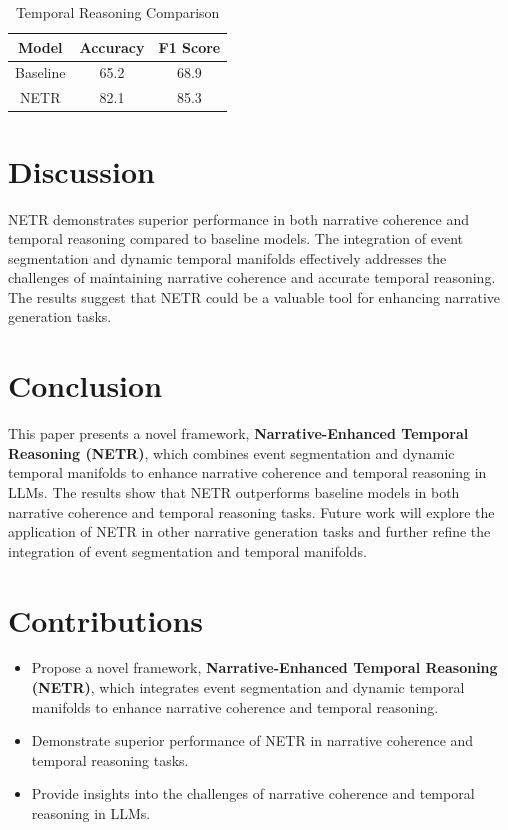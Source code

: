 \documentclass{article}
\begin{document}
\begin{table}[h!]
\centering
\caption{Temporal Reasoning Comparison}
\label{tab:temporal_reasoning}
\begin{tabular}{|c|c|c|}
\hline
Model & Accuracy & F1 Score \\
\hline
Baseline & 65.2 & 68.9 \\
NETR & 82.1 & 85.3 \\
\hline
\end{tabular}
\end{table}

\section{Discussion}
NETR demonstrates superior performance in both narrative coherence and temporal reasoning compared to baseline models. The integration of event segmentation and dynamic temporal manifolds effectively addresses the challenges of maintaining narrative coherence and accurate temporal reasoning. The results suggest that NETR could be a valuable tool for enhancing narrative generation tasks.

\section{Conclusion}
This paper presents a novel framework, \textbf{Narrative-Enhanced Temporal Reasoning (NETR)}, which combines event segmentation and dynamic temporal manifolds to enhance narrative coherence and temporal reasoning in LLMs. The results show that NETR outperforms baseline models in both narrative coherence and temporal reasoning tasks. Future work will explore the application of NETR in other narrative generation tasks and further refine the integration of event segmentation and temporal manifolds.

\section{Contributions}
\begin{itemize}
    \item Propose a novel framework, \textbf{Narrative-Enhanced Temporal Reasoning (NETR)}, which integrates event segmentation and dynamic temporal manifolds to enhance narrative coherence and temporal reasoning.
    \item Demonstrate superior performance of NETR in narrative coherence and temporal reasoning tasks.
    \item Provide insights into the challenges of narrative coherence and temporal reasoning in LLMs.
\end{itemize}
\end{document}
